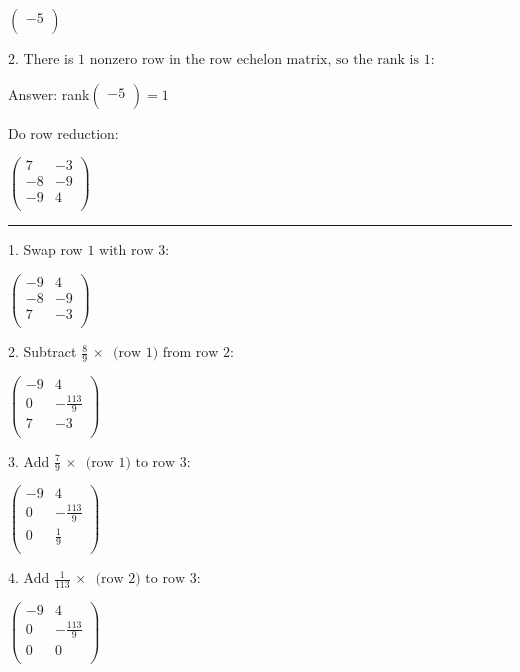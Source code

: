 \documentclass{article}
\begin{document}
$\left(
\begin{array}{c}
-5 \\
\end{array}
\right)$

2. There is $1\text{ nonzero row in the row echelon matrix, so the rank is }1:$

Answer: rank$\left(
\begin{array}{c}
-5 \\
\end{array}
\right)=1$

\pagebreak

Do row reduction:

$\left(
\begin{array}{cc}
7 & -3 \\
 -8 & -9 \\
 -9 & 4 \\
\end{array}
\right)$

\hrule

1. Swap row $1\text{ with row }3:$

$\left(
\begin{array}{cc}
-9 & 4 \\
 -8 & -9 \\
 7 & -3 \\
\end{array}
\right)$

2. Subtract $\frac{8}{9}\, \times \,\text{ (row }1)\text{ from row }2:$

$\left(
\begin{array}{cc}
-9 & 4 \\
 0 & -\frac{113}{9} \\
 7 & -3 \\
\end{array}
\right)$

3. Add $\frac{7}{9}\, \times \,\text{ (row }1)\text{ to row }3:$

$\left(
\begin{array}{cc}
-9 & 4 \\
 0 & -\frac{113}{9} \\
 0 & \frac{1}{9} \\
\end{array}
\right)$

4. Add $\frac{1}{113}\, \times \,\text{ (row }2)\text{ to row }3:$

$\left(
\begin{array}{cc}
-9 & 4 \\
 0 & -\frac{113}{9} \\
 0 & 0 \\
\end{array}
\right)$
\end{document}

